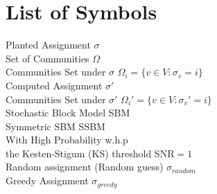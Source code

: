 \chapter*{List of Symbols}

\begin{large}
Planted Assignment \hfill $\sigma$\vspace{3mm}\\ 
Set of Communities \hfill $\Omega$\vspace{3mm}\\
Communities Set under $\sigma$ \hfill $\Omega_i=\{v\in V: \sigma_v=i\}$\vspace{3mm}\\
Computed Assignment \hfill $\sigma'$\vspace{3mm}\\
Communities Set under $\sigma'$ \hfill $\Omega_i'=\{v\in V: \sigma_v'=i\}$\vspace{3mm}\\
Stochastic Block Model \hfill SBM\vspace{3mm}\\
Symmetric SBM \hfill SSBM\vspace{3mm}\\
With High Probability \hfill w.h.p\vspace{3mm}\\
the Kesten-Stigum (KS) threshold \hfill SNR$=1$\vspace{3mm}\\
Random assignment (Random guess) \hfill $\sigma_{random}$\vspace{3mm}\\
Greedy Assignment \hfill $\sigma_{greedy}$\vspace{3mm}\\
\end{large}